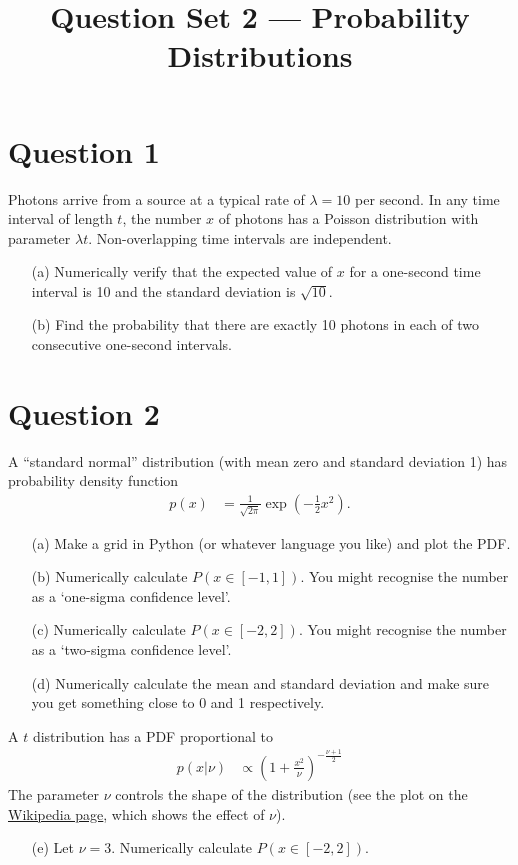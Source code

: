 \documentclass[a4paper, 12pt]{article}
\title{Question Set 2 --- Probability Distributions}
\author{}
\date{}
\begin{document}
\maketitle


\setlength{\parindent}{0pt}
\setlength{\parskip}{8pt}

\section*{Question 1}
Photons arrive from a source at a typical rate of $\lambda = 10$ per second.
In any time interval of length $t$, the number $x$ of photons has a
Poisson distribution with parameter $\lambda t$.
Non-overlapping time intervals are independent.

\begin{enumerate}
\item[(a)] Numerically verify that the expected value of $x$ for a one-second
           time interval is 10 and the standard deviation is $\sqrt{10}$.
\item[(b)] Find the probability that there are exactly 10 photons in each of
           two consecutive one-second intervals.
\end{enumerate}


\section*{Question 2}
A ``standard normal'' distribution (with mean zero and standard deviation 1)
has probability density function
\begin{align}
p(x) &= \frac{1}{\sqrt{2\pi}} \exp\left(-\frac{1}{2}x^2\right).
\end{align}

\begin{enumerate}
\item[(a)] Make a grid in Python (or whatever language you like) and plot
           the PDF.
\item[(b)] Numerically calculate $P(x \in [-1, 1])$. You might recognise the
           number as a `one-sigma confidence level'.
\item[(c)] Numerically calculate $P(x \in [-2, 2])$. You might recognise the
           number as a `two-sigma confidence level'.
\item[(d)] Numerically calculate the mean and standard deviation and make sure
           you get something close to 0 and 1 respectively.
\end{enumerate}

A $t$ distribution has a PDF proportional to
\begin{align}
p(x | \nu) &\propto \left(1 + \frac{x^2}{\nu}\right)^{-\frac{\nu + 1}{2}}
\end{align}
The parameter $\nu$ controls the shape of the distribution
(see the plot on the \href{https://en.wikipedia.org/wiki/Student\%27s_t-distribution}{Wikipedia page}, which shows the effect of $\nu$).

\begin{enumerate}
\item[(e)] Let $\nu=3$. Numerically calculate $P(x \in [-2, 2])$.
\end{enumerate}
\end{document}
